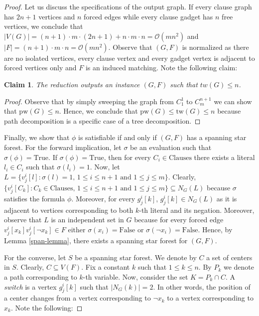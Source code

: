 \documentclass[en]{pracamgr}
\newtheorem{claim}{Claim}
\theoremstyle{definition}
\newcommand{\true}{\textrm{True}}
\newcommand{\false}{\textrm{False}}
\begin{document}
\begin{proof}
	Let us discuss the specifications of the output graph. If every clause graph has $2n+1$ vertices and $n$ forced edges while every clause gadget has $n$ free vertices, we conclude that $|V(G)| = (n+1) \cdot m \cdot (2n+1) + n \cdot m \cdot n= \mathcal{O}(mn^2)$ and $|F|=(n+1) \cdot m \cdot n= \mathcal{O}(mn^2)$. Observe that $(G,F)$ is normalized as there are no isolated vertices, every clause vertex and every gadget vertex is adjacent to forced vertices only and $F$ is an induced matching. Note the following claim:
	
	\begin{claim}
		The reduction outputs an instance $(G,F)$ such that $tw(G) \leq n$.
	\end{claim}

	\begin{proof}
		Observe that by simply sweeping the graph from $C^1_1$ to $C^{n+1}_m$ we can show that $\textrm{pw}(G) \leq n$. Hence, we conclude that $\textrm{pw}(G) \leq \textrm{tw}(G) \leq n$ because path decomposition is a specific case of a tree decomposition.
	\end{proof}
	
	Finally, we show that $\phi$ is satisfiable if and only if $(G,F)$ has a spanning star forest. For the forward implication, let $\sigma$ be an evaluation such that $\sigma(\phi)=\true$. If $\sigma(\phi)=\textrm{True}$, then for every $C_i \in \textrm{Clauses}$ there exists a literal $l_i \in C_i$ such that $\sigma(l_i)=1$. Now, let $L = \{v^i_j[l]: \sigma(l)=1\text{, } 1 \leq i \leq n+1 \text{ and } 1 \leq j \leq m\}$. Clearly, $\{v^i_j[C_k]: C_k \in \textrm{Clauses} \text{, } 1 \leq i \leq n+1 \text{ and } 1 \leq j \leq m\} \subseteq N_G(L)$ because $\sigma$ satisfies the formula $\phi$. Moreover, for every $g^i_j[k]$, $g^i_j[k] \in N_G(L)$ as it is adjacent to vertices corresponding to both $k$-th literal and its negation. Moreover, observe that $L$ is an independent set in $G$ because for every forced edge $v^i_j[x_k]v^i_j[\neg x_k] \in F$ either $\sigma(x_i)=\false$ or $\sigma(\neg x_i)=\false$. Hence, by Lemma \ref{span-lemma}, there exists a spanning star forest for $(G,F)$.
	
	For the converse, let $S$ be a spanning star forest. We denote by $C$ a set of centers in $S$. Clearly, $C \subseteq V(F)$. Fix a constant $k$ such that $1 \leq k \leq n$. By $P_k$ we denote a path corresponding to $k$-th variable. Now, consider the set $K = P_k \cap C$. A \textit{switch} is a vertex $g^i_j[k]$ such that $|N_G(k)|=2$. In other words, the position of a center changes from a vertex corresponding to $\neg x_k$ to a vertex corresponding to $x_k$. Note the following:
	

\end{proof}
\end{document}
